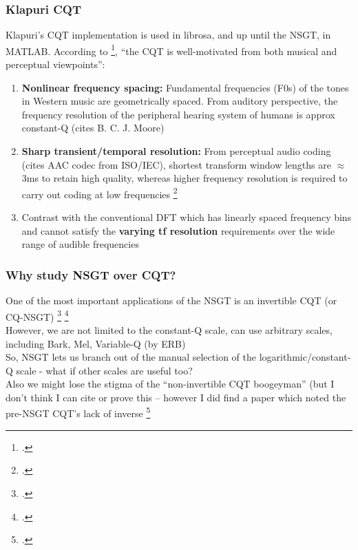 \documentclass[usenames,dvipsnames]{beamer}
\begin{document}
\begin{frame}
	\frametitle{Klapuri CQT}
	Klapuri's CQT implementation is used in librosa, and up until the NSGT, in MATLAB. According to \footcite{klapuricqt}, ``the CQT is well-motivated from both musical and perceptual viewpoints'':
	\begin{enumerate}
		\item
			\textbf{Nonlinear frequency spacing:} Fundamental frequencies (F0s) of the tones in Western music are geometrically spaced. From auditory perspective, the frequency resolution of the peripheral hearing system of humans is approx constant-Q (cites B. C. J. Moore)
		 \item
			 \textbf{Sharp transient/temporal resolution:} From perceptual audio coding (cites AAC codec from ISO/IEC), shortest transform window lengths are $\approx$ 3ms to retain high quality, whereas higher frequency resolution is required to carry out coding at low frequencies \footcite{cqtransient}
		\item
			Contrast with the conventional DFT which has linearly spaced frequency bins and cannot satisfy the \textbf{varying tf resolution} requirements over the wide range of audible frequencies
	\end{enumerate}
\end{frame}

\begin{frame}
	\frametitle{Why study NSGT over CQT?}
	One of the most important applications of the NSGT is an invertible CQT (or CQ-NSGT) \footcite{invertiblecqt} \footcite{variableq1}\\
	However, we are not limited to the constant-Q scale, can use arbitrary scales, including Bark, Mel, Variable-Q (by ERB)\\
	So, NSGT lets us branch out of the manual selection of the logarithmic/constant-Q scale - what if other scales are useful too?\\
	Also we might lose the stigma of the ``non-invertible CQT boogeyman'' (but I don't think I can cite or prove this -- however I did find a paper which noted the pre-NSGT CQT's lack of inverse \footcite{lackinverse}
\end{frame}
\end{document}
